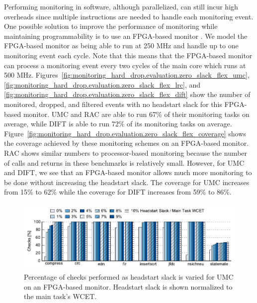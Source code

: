 Performing monitoring in software, although parallelized, can still incur high
overheads since multiple instructions are needed to handle each monitoring
event. One possible solution to improve the performance of monitoring while
maintaining programmability is to use an FPGA-based monitor
\cite{flexcore-micro10}. We model the FPGA-based monitor as being able to
run at 250 MHz and handle up to one monitoring event each cycle. Note that this
means that the FPGA-based monitor can process a monitoring event every two
cycles of the main core which runs at 500 MHz.
Figures~\ref{fig:monitoring_hard_drop.evaluation.zero_slack_flex_umc},
\ref{fig:monitoring_hard_drop.evaluation.zero_slack_flex_lrc}, and
\ref{fig:monitoring_hard_drop.evaluation.zero_slack_flex_dift} show the
number of monitored, dropped, and filtered events with no headstart slack for
this FPGA-based monitor. UMC and RAC are able to run 67\% of their monitoring
tasks on average, while DIFT is able to run 72\% of its monitoring tasks on
average.
Figure~\ref{fig:monitoring_hard_drop.evaluation.zero_slack_flex_coverage} shows
the coverage achieved by these monitoring schemes on an FPGA-based monitor. RAC
shows similar numbers to processor-based monitoring because the number of calls
and returns in these benchmarks is relatively small. However, for UMC and DIFT,
we see that an FPGA-based monitor allows much more monitoring to be done
without increasing the headstart slack. The coverage for UMC increases from
15\% to 62\% while the coverage for DIFT increases from 59\% to 86\%.

\begin{figure}
  \begin{center}
    \includegraphics{monitoring_hard_drop/data/flex_umc_sweep.pdf}
    \caption{Percentage of checks performed as headstart slack is varied for
    UMC on an FPGA-based monitor. Headstart slack is shown normalized to the
    main task's WCET.}
    \label{fig:monitoring_hard_drop.evaluation.flex_umc_sweep}
  \end{center}
\end{figure}

